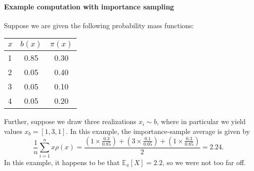 \documentclass[12pt]{article}
\begin{document}
\paragraph{Example computation with importance sampling} Suppose we are given the following probability mass functions:
\begin{table}[h]
  \centering
  \begin{tabular}{l | c | c}
    $x$ & $b(x)$ & $\pi(x)$ \\
    \hline
    1   & 0.85   & 0.30 \\
    2   & 0.05   & 0.40 \\
    3   & 0.05   & 0.10 \\
    4   & 0.05   & 0.20
  \end{tabular}
\end{table}
Further, suppose we draw three realizations $x_i \sim b$, where in particular we yield values $x_b = [1, 3, 1]$. In this example, the importance-sample average is given by
\[
  \frac{1}{n} \sum_{i=1}^n x \rho(x) = \frac{\left(1 \times \frac{0.3}{0.85}\right) + \left(3 \times \frac{0.1}{0.05}\right) + \left(1 \times \frac{0.3}{0.85}\right)}{2} = 2.24.
\]
In this example, it happens to be that $\mathbb E_\pi[X] = 2.2$, so we were not too far off.
\end{document}
